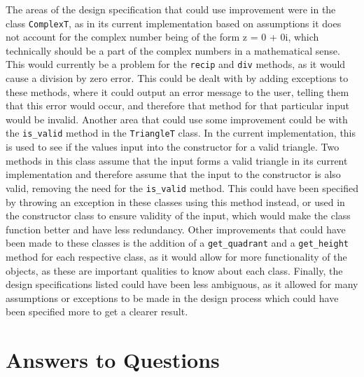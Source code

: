 \documentclass[12pt]{article}
\begin{document}
The areas of the design specification that could use improvement were in the 
class \verb|ComplexT|, as in its current implementation based on assumptions 
it does not account for the complex number being of the form z = 0 + 0i, which 
technically should be a part of the complex numbers in a mathematical sense. 
This would currently be a problem for the \verb|recip| and \verb|div| methods, 
as it would cause a division by zero error. This could be dealt with by adding 
exceptions to these methods, where it could output an error message to the user, 
telling them that this error would occur, and therefore that method for that 
particular input would be invalid. Another area that could use some improvement 
could be with the \verb|is_valid| method in the \verb|TriangleT| class. In the 
current implementation, this is used to see if the values input into the 
constructor for a valid triangle. Two methods in this class assume that the input 
forms a valid triangle in its current implementation and therefore assume that 
the input to the constructor is also valid, removing the need for the 
\verb|is_valid| method. This could have been specified by throwing an exception 
in these classes using this method instead, or used in the constructor class to 
ensure validity of the input, which would make the class function better and have 
less redundancy. Other improvements that could have been made to these classes 
is the addition of a \verb|get_quadrant| and a \verb|get_height| method for each 
respective class, as it would allow for more functionality of the objects, as 
these are important qualities to know about each class. Finally, the design 
specifications listed could have been less ambiguous, as it allowed for many 
assumptions or exceptions to be made in the design process which could have been 
specified more to get a clearer result. 

\section{Answers to Questions}
\end{document}

